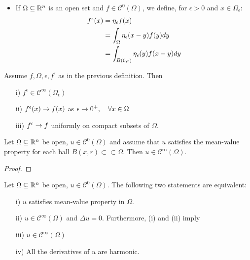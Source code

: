 \begin{DefBox}
\begin{Def}
\begin{itemize}
\begin{equation*}
            \end{equation*}
            \item If $\Omega \subseteq \mathbb{R}^n$ is an open set and $f \in \mathcal{C}^0(\Omega)$, we define, for $\epsilon > 0$ and $x \in \Omega_\epsilon$:
            \begin{align*}
                f^\epsilon(x) &= \eta_\epsilon \* f(x) \\
                &= \int_\Omega \eta_\epsilon(x-y) f(y) dy \\
                &= \int_{B(0,\epsilon)} \eta_\epsilon(y) f(x-y) dy
            \end{align*}
        \end{itemize}
    \end{Def}
\end{DefBox}
\begin{ThBox}
    \begin{Th}
        Assume $f, \Omega, \epsilon, f^\epsilon$ as in the previous definition. Then
        \begin{itemize}
            \item [i)] $ f^ \epsilon \in \mathcal{C}^\infty(\Omega_\epsilon)$
            \item [ii)] $f^\epsilon(x) \rightarrow f(x)$ as $\epsilon \rightarrow 0^+, \quad \forall x \in \Omega$
            \item [iii)] $f^ \epsilon \rightarrow f$ uniformly on compact subsets of $\Omega$. 
        \end{itemize}
    \end{Th}
\end{ThBox}
\begin{ThBox}
    \begin{Th}[Smoothness]
        Let $\Omega \subseteq \mathbb{R}^n$ be open, $u \in \mathcal{C}^0(\Omega)$ and assume that $u$ satisfies the mean-value property for each ball $B(x,r) \subset \subset \Omega$. Then $u \in \mathcal{C}^\infty(\Omega)$. 
    \end{Th}
\end{ThBox}
\begin{ProofBox}
    \begin{proof}
        
    \end{proof}
\end{ProofBox}
\begin{PropBox}
    \begin{Cor}
        Let $\Omega \subseteq \mathbb{R}^n$ be open, $u \in \mathcal{C}^0(\Omega)$. The following two statements are equivalent:
        \begin{itemize}
            \item [i)] $u$ satisfies mean-value property in $\Omega$.
            \item [ii)] $u \in \mathcal{C}^\infty(\Omega)$ and $\Delta u= 0$. Furthermore, (i) and (ii) imply
            \item [iii)] $u \in \mathcal{C}^\infty(\Omega)$
            \item [iv)] All the derivatives of $u$ are harmonic. 
        \end{itemize}
    \end{Cor}
\end{PropBox}
